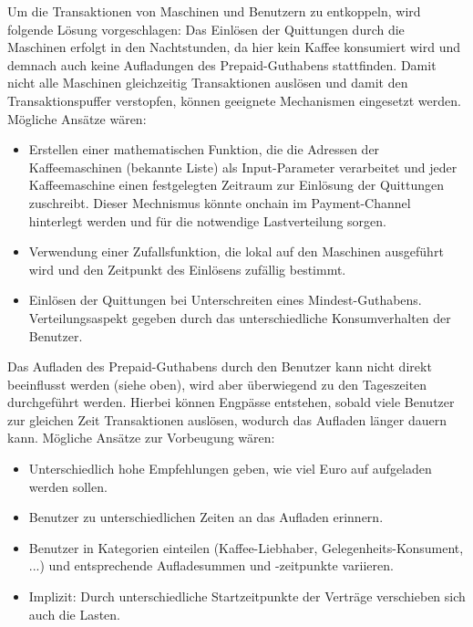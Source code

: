 Um die Transaktionen von Maschinen und Benutzern zu entkoppeln, wird folgende Lösung vorgeschlagen: Das Einlösen der Quittungen durch die Maschinen erfolgt in den Nachtstunden, da hier kein Kaffee konsumiert wird und demnach auch keine Aufladungen des Prepaid-Guthabens stattfinden. Damit nicht alle Maschinen gleichzeitig Transaktionen auslösen und damit den Transaktionspuffer verstopfen, können geeignete Mechanismen eingesetzt werden. Mögliche Ansätze wären:
\begin{itemize}
  \item Erstellen einer mathematischen Funktion, die die Adressen der Kaffeemaschinen (bekannte Liste) als Input-Parameter verarbeitet und jeder Kaffeemaschine einen festgelegten Zeitraum zur Einlösung der Quittungen zuschreibt. Dieser Mechnismus könnte onchain im Payment-Channel hinterlegt werden und für die notwendige Lastverteilung sorgen.
  \item Verwendung einer Zufallsfunktion, die lokal auf den Maschinen ausgeführt wird und den Zeitpunkt des Einlösens zufällig bestimmt.
  \item Einlösen der Quittungen bei Unterschreiten eines Mindest-Guthabens. Verteilungsaspekt gegeben durch das unterschiedliche Konsumverhalten der Benutzer.
\end{itemize}

Das Aufladen des Prepaid-Guthabens durch den Benutzer kann nicht direkt beeinflusst werden (siehe oben), wird aber überwiegend zu den Tageszeiten durchgeführt werden. Hierbei können Engpässe entstehen, sobald viele Benutzer zur gleichen Zeit Transaktionen auslösen, wodurch das Aufladen länger dauern kann. Mögliche Ansätze zur Vorbeugung wären:
\begin{itemize}
  \item Unterschiedlich hohe Empfehlungen geben, wie viel Euro auf aufgeladen werden sollen.
  \item Benutzer zu unterschiedlichen Zeiten an das Aufladen erinnern.
  \item Benutzer in Kategorien einteilen (Kaffee-Liebhaber, Gelegenheits-Konsument, ...) und entsprechende Aufladesummen und -zeitpunkte variieren.
  \item Implizit: Durch unterschiedliche Startzeitpunkte der Verträge verschieben sich auch die Lasten.
\end{itemize}


